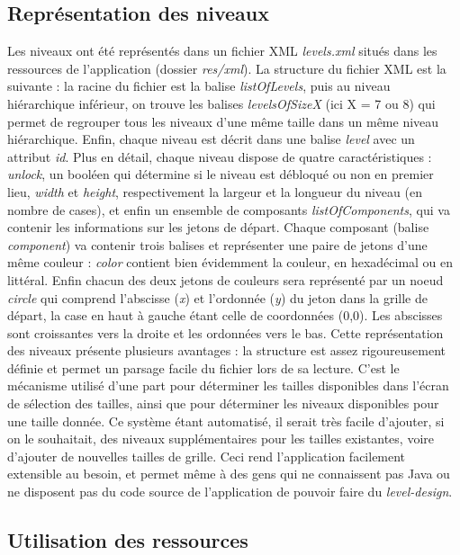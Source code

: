 \documentclass[12pt, a4paper]{article}%
\begin{document}
    \subsection{Représentation des niveaux}
    Les niveaux ont été représentés dans un fichier XML \textit{levels.xml} situés dans les ressources de l'application (dossier \textit{res/xml}). La structure du fichier XML est la suivante : la racine du fichier est la balise \textit{listOfLevels}, puis au niveau hiérarchique inférieur, on trouve les balises \textit{levelsOfSizeX} (ici X = 7 ou 8) qui permet de regrouper tous les niveaux d'une même taille dans un même niveau hiérarchique. Enfin, chaque niveau est décrit dans une balise \textit{level} avec un attribut \textit{id}.
    \newline
    Plus en détail, chaque niveau dispose de quatre caractéristiques : \textit{unlock}, un booléen qui détermine si le niveau est débloqué ou non en premier lieu, \textit{width} et \textit{height}, respectivement la largeur et la longueur du niveau (en nombre de cases), et enfin un ensemble de composants \textit{listOfComponents}, qui va contenir les informations sur les jetons de départ. Chaque composant (balise \textit{component}) va contenir trois balises et représenter une paire de jetons d'une même couleur : \textit{color} contient bien évidemment la couleur, en hexadécimal ou en littéral. Enfin chacun des deux jetons de couleurs sera représenté par un noeud \textit{circle} qui comprend l'abscisse (\textit{x}) et l'ordonnée (\textit{y}) du jeton dans la grille de départ, la case en haut à gauche étant celle de coordonnées (0,0). Les abscisses sont croissantes vers la droite et les ordonnées vers le bas.
    \newline
    Cette représentation des niveaux présente plusieurs avantages : la structure est assez rigoureusement définie et permet un parsage facile du fichier lors de sa lecture. C'est le mécanisme utilisé d'une part pour déterminer les tailles disponibles dans l'écran de sélection des tailles, ainsi que pour déterminer les niveaux disponibles pour une taille donnée. Ce système étant automatisé, il serait très facile d'ajouter, si on le souhaitait, des niveaux supplémentaires pour les tailles existantes, voire d'ajouter de nouvelles tailles de grille. Ceci rend l'application facilement extensible au besoin, et permet même à des gens qui ne connaissent pas Java ou ne disposent pas du code source de l'application de pouvoir faire du \textit{level-design}.
    
    \subsection{Utilisation des ressources}
\end{document}

